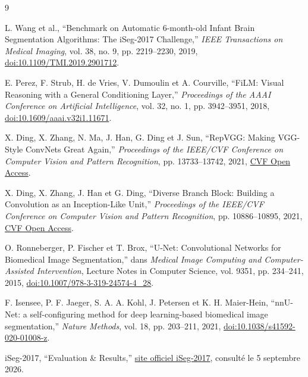 \documentclass[11pt,a4paper]{article}
\begin{document}
\begin{thebibliography}{9}

L. Wang et al.,
``Benchmark on Automatic 6-month-old Infant Brain Segmentation Algorithms:
The iSeg-2017 Challenge,''
\textit{IEEE Transactions on Medical Imaging}, vol. 38, no. 9,
pp. 2219--2230, 2019,
\href{https://doi.org/10.1109/TMI.2019.2901712}{doi:10.1109/TMI.2019.2901712}.

E. Perez, F. Strub, H. de Vries, V. Dumoulin et A. Courville,
``FiLM: Visual Reasoning with a General Conditioning Layer,''
\textit{Proceedings of the AAAI Conference on Artificial Intelligence},
vol. 32, no. 1, pp. 3942--3951, 2018,
\href{https://doi.org/10.1609/aaai.v32i1.11671}
{doi:10.1609/aaai.v32i1.11671}.

X. Ding, X. Zhang, N. Ma, J. Han, G. Ding et J. Sun,
``RepVGG: Making VGG-Style ConvNets Great Again,''
\textit{Proceedings of the IEEE/CVF Conference on Computer Vision and Pattern
Recognition}, pp. 13733--13742, 2021,
\href{https://openaccess.thecvf.com/content/CVPR2021/html/Ding_RepVGG_Making_VGG-Style_ConvNets_Great_Again_CVPR_2021_paper.html}
{CVF Open Access}.

X. Ding, X. Zhang, J. Han et G. Ding,
``Diverse Branch Block: Building a Convolution as an Inception-Like Unit,''
\textit{Proceedings of the IEEE/CVF Conference on Computer Vision and Pattern
Recognition}, pp. 10886--10895, 2021,
\href{https://openaccess.thecvf.com/content/CVPR2021/html/Ding_Diverse_Branch_Block_Building_a_Convolution_as_an_Inception-Like_Unit_CVPR_2021_paper.html}
{CVF Open Access}.

O. Ronneberger, P. Fischer et T. Brox,
``U-Net: Convolutional Networks for Biomedical Image Segmentation,''
dans \textit{Medical Image Computing and Computer-Assisted Intervention},
Lecture Notes in Computer Science, vol. 9351, pp. 234--241, 2015,
\href{https://doi.org/10.1007/978-3-319-24574-4_28}
{doi:10.1007/978-3-319-24574-4\_28}.

F. Isensee, P. F. Jaeger, S. A. A. Kohl, J. Petersen et K. H. Maier-Hein,
``nnU-Net: a self-configuring method for deep learning-based biomedical image
segmentation,''
\textit{Nature Methods}, vol. 18, pp. 203--211, 2021,
\href{https://doi.org/10.1038/s41592-020-01008-z}
{doi:10.1038/s41592-020-01008-z}.

iSeg-2017,
``Evaluation \& Results,''
\href{https://iseg2017.web.unc.edu/rules/results/}{site officiel iSeg-2017},
consulté le 5 septembre 2026.

\end{thebibliography}
\end{document}

